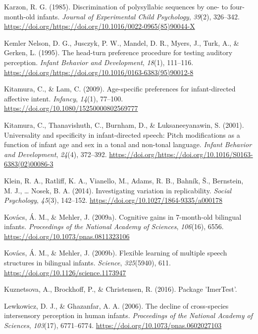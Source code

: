 \documentclass[,man,floatsintext]{apa6}
\begin{document}
\leavevmode\hypertarget{ref-karzon_1985}{}%
Karzon, R. G. (1985). Discrimination of polysyllabic sequences by one- to four-month-old infants. \emph{Journal of Experimental Child Psychology}, \emph{39}(2), 326--342. \url{https://doi.org/https://doi.org/10.1016/0022-0965(85)90044-X}

\leavevmode\hypertarget{ref-kemler_nelson_1995}{}%
Kemler Nelson, D. G., Jusczyk, P. W., Mandel, D. R., Myers, J., Turk, A., \& Gerken, L. (1995). The head-turn preference procedure for testing auditory perception. \emph{Infant Behavior and Development}, \emph{18}(1), 111--116. \url{https://doi.org/https://doi.org/10.1016/0163-6383(95)90012-8}

\leavevmode\hypertarget{ref-kitamura_2009}{}%
Kitamura, C., \& Lam, C. (2009). Age-specific preferences for infant-directed affective intent. \emph{Infancy}, \emph{14}(1), 77--100. \url{https://doi.org/10.1080/15250000802569777}

\leavevmode\hypertarget{ref-kitamura_2001}{}%
Kitamura, C., Thanavishuth, C., Burnham, D., \& Luksaneeyanawin, S. (2001). Universality and specificity in infant-directed speech: Pitch modifications as a function of infant age and sex in a tonal and non-tonal language. \emph{Infant Behavior and Development}, \emph{24}(4), 372--392. \url{https://doi.org/https://doi.org/10.1016/S0163-6383(02)00086-3}

\leavevmode\hypertarget{ref-klein_2014}{}%
Klein, R. A., Ratliff, K. A., Vianello, M., Adams, R. B., Bahník, Š., Bernstein, M. J., \ldots{} Nosek, B. A. (2014). Investigating variation in replicability. \emph{Social Psychology}, \emph{45}(3), 142--152. \url{https://doi.org/10.1027/1864-9335/a000178}

\leavevmode\hypertarget{ref-kovacs_2009a}{}%
Kovács, Á. M., \& Mehler, J. (2009a). Cognitive gains in 7-month-old bilingual infants. \emph{Proceedings of the National Academy of Sciences}, \emph{106}(16), 6556. \url{https://doi.org/10.1073/pnas.0811323106}

\leavevmode\hypertarget{ref-kovacs_2009b}{}%
Kovács, Á. M., \& Mehler, J. (2009b). Flexible learning of multiple speech structures in bilingual infants. \emph{Science}, \emph{325}(5940), 611. \url{https://doi.org/10.1126/science.1173947}

\leavevmode\hypertarget{ref-kuznetsova_2016}{}%
Kuznetsova, A., Brockhoff, P., \& Christensen, R. (2016). Package 'ImerTest'.

\leavevmode\hypertarget{ref-lewkowicz_2006}{}%
Lewkowicz, D. J., \& Ghazanfar, A. A. (2006). The decline of cross-species intersensory perception in human infants. \emph{Proceedings of the National Academy of Sciences}, \emph{103}(17), 6771--6774. \url{https://doi.org/10.1073/pnas.0602027103}
\end{document}
